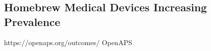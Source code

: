 \documentclass{article}
\begin{document}
\cite{topol2015patient}

\subsection{Homebrew Medical Devices Increasing Prevalence}


\cite{carson2010homebrew}



\cite{lausted2004posam}




https://openaps.org/outcomes/
OpenAPS
\cite{lewis2015introducing}





\cite{OpenSourceHealthcare}
\cite{carsonopensource}
\cite{MarketsNotCapitalism}
\cite{carsonhealthcare}



\end{document}
